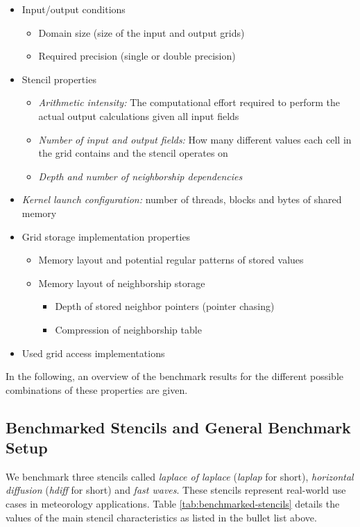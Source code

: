 \begin{itemize}
	\item 
		Input/output conditions 
		\begin{itemize}
			\item Domain size (size of the input and output grids)
			\item Required precision (single or double precision)
		\end{itemize}
	\item
		Stencil properties
		\begin{itemize}
			\item \emph{Arithmetic intensity:} The computational effort required to perform the actual output calculations given all input fields
			\item \emph{Number of input and output fields:} How many different values each cell in the grid contains and the stencil operates on
			\item \emph{Depth and number of neighborship dependencies}
		\end{itemize}
	\item
		\emph{Kernel launch configuration:} number of threads, blocks and bytes of shared memory
	\item
		Grid storage implementation properties
		\begin{itemize}
			\item Memory layout and potential regular patterns of stored values
			\item 
				Memory layout of neighborship storage
				\begin{itemize}
					\item Depth of stored neighbor pointers (pointer chasing)
					\item Compression of neighborship table
				\end{itemize}
		\end{itemize}
	\item
		Used grid access implementations
\end{itemize}

In the following, an overview of the benchmark results for the different possible combinations of these properties are given.

\subsection{Benchmarked Stencils and General Benchmark Setup}\label{sec:benchmark-setup}

We benchmark three stencils called \emph{laplace of laplace} (\emph{laplap} for short), \emph{horizontal diffusion} (\emph{hdiff} for short) and \emph{fast waves}. These stencils represent real-world use cases in meteorology applications. Table \ref{tab:benchmarked-stencils} details the values of the main stencil characteristics as listed in the bullet list above.

